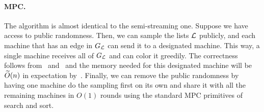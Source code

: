 \paragraph{MPC.} The algorithm is almost identical to the semi-streaming one. Suppose we have access to public randomness. Then, we can sample the lists $\mathcal{L}$ publicly, and each machine that has an 
edge in $G_{\mathcal{L}}$ can send it to a designated machine. This way, a single machine receives all of $G_{\mathcal{L}}$ and can color it greedily. The correctness follows from~ and~ and the memory needed for this designated machine will be $\widetilde{O}(n)$ in expectation by~. 
Finally, we can remove the public randomness by having one machine do the sampling first on its own and share it with all the remaining machines in $O(1)$ rounds using the standard MPC primitives of search and sort. 


 